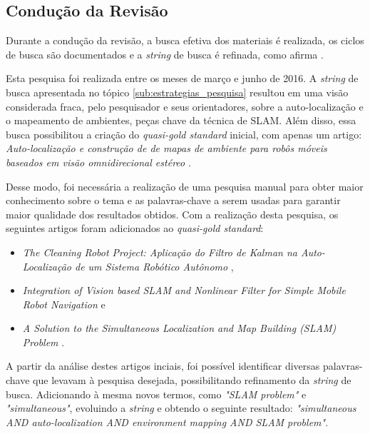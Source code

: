 		

	\subsection{Condução da Revisão} %
	\label{sub:conducaoRevisao}
		
		Durante a condução da revisão, a busca efetiva dos materiais é realizada, os ciclos de busca são documentados e a \textit{string} de busca é refinada, como afirma \cite{estudoPrimarioSecundario}.

		Esta pesquisa foi realizada entre os meses de março e junho de 2016. A \textit{string} de busca apresentada no tópico \ref{sub:estrategias_pesquisa} resultou em uma visão considerada fraca, pelo pesquisador e seus orientadores, sobre a auto-localização e o mapeamento de ambientes, peças chave da técnica de SLAM. Além disso, essa busca possibilitou a criação do \textit{quasi-gold standard} inicial, com apenas um artigo: \textit{Auto-localização e construção de de mapas de ambiente para robôs móveis baseados em visão omnidirecional estéreo} \cite{localizacaoEMapeamentoPaulo}. 

		Desse modo, foi necessária a realização de uma pesquisa manual para obter maior conhecimento sobre o tema e as palavras-chave a serem usadas para garantir maior qualidade dos resultados obtidos. Com a realização desta pesquisa, os seguintes artigos foram adicionados ao \textit{quasi-gold standard}:

		\begin{itemize}
			\item \textit{The Cleaning Robot Project: Aplicação do Filtro de Kalman na Auto-Localização de um Sistema Robótico Autônomo} \cite{theCleaningProject},
			\item \textit{Integration of Vision based SLAM and Nonlinear Filter for Simple Mobile Robot Navigation} \cite{integrationVisionSLAMnonlinear} e
			\item \textit{A Solution to the Simultaneous Localization and Map Building (SLAM) Problem} \cite{slamProblem}.
		\end{itemize}

		A partir da análise destes artigos inciais, foi possível identificar diversas palavras-chave que levavam à pesquisa desejada, possibilitando refinamento da \textit{string} de busca. Adicionando à mesma novos termos, como \textit{"SLAM problem"} e \textit{"simultaneous"}, evoluindo a \textit{string} e obtendo o seguinte resultado: \textit{"simultaneous AND auto-localization AND environment mapping AND SLAM problem"}.
		
